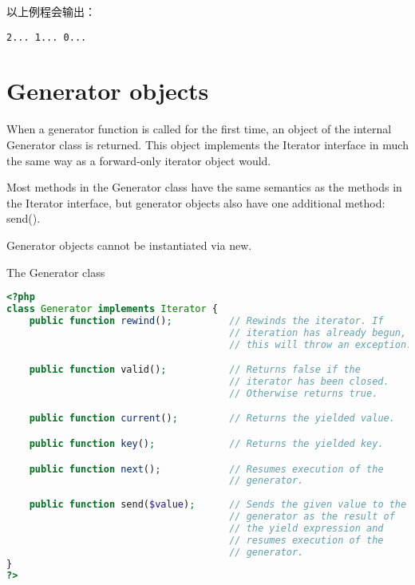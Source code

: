 以上例程会输出：

\begin{verbatim}
2... 1... 0... 
\end{verbatim}


\section{Generator objects}


When a generator function is called for the first time, an object of the internal Generator class is returned. This object implements the Iterator interface in much the same way as a forward-only iterator object would.

Most methods in the Generator class have the same semantics as the methods in the Iterator interface, but generator objects also have one additional method: send().

Generator objects cannot be instantiated via new.



\begin{example}
The Generator class
\begin{lstlisting}[language=PHP]
<?php
class Generator implements Iterator {
    public function rewind();          // Rewinds the iterator. If
                                       // iteration has already begun,
                                       // this will throw an exception.

    public function valid();           // Returns false if the
                                       // iterator has been closed.
                                       // Otherwise returns true.

    public function current();         // Returns the yielded value.

    public function key();             // Returns the yielded key.

    public function next();            // Resumes execution of the
                                       // generator.
    
    public function send($value);      // Sends the given value to the
                                       // generator as the result of
                                       // the yield expression and
                                       // resumes execution of the
                                       // generator.
}
?>
\end{lstlisting}
\end{example}


